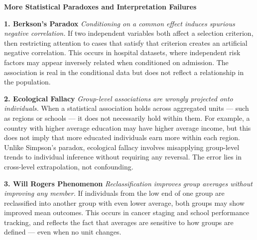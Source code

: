 \begin{center}
{\Large \textbf{More Statistical Paradoxes and Interpretation Failures}}

\end{center}

\vspace{1em}

\begin{tcolorbox}[
  colback=gray!2,
  colframe=gray!60,
  boxrule=0.4pt,
  width=\textwidth,
  arc=1pt,
  left=8pt,
  right=8pt,
  top=6pt,
  bottom=6pt,
  shadow={0mm}{-0.5mm}{0mm}{gray!30}
]

\textbf{1. Berkson’s Paradox}  
\emph{Conditioning on a common effect induces spurious negative correlation.}  
If two independent variables both affect a selection criterion, then restricting attention to cases that satisfy that criterion creates an artificial negative correlation. This occurs in hospital datasets, where independent risk factors may appear inversely related when conditioned on admission. The association is real in the conditional data but does not reflect a relationship in the population.

\vspace{1em}

\textbf{2. Ecological Fallacy}  
\emph{Group-level associations are wrongly projected onto individuals.}  
When a statistical association holds across aggregated units — such as regions or schools — it does not necessarily hold within them. For example, a country with higher average education may have higher average income, but this does not imply that more educated individuals earn more within each region. Unlike Simpson’s paradox, ecological fallacy involves misapplying group-level trends to individual inference without requiring any reversal. The error lies in cross-level extrapolation, not confounding.

\vspace{1em}

\textbf{3. Will Rogers Phenomenon}  
\emph{Reclassification improves group averages without improving any member.}  
If individuals from the low end of one group are reclassified into another group with even lower average, both groups may show improved mean outcomes. This occurs in cancer staging and school performance tracking, and reflects the fact that averages are sensitive to how groups are defined — even when no unit changes.

\vspace{1em}


\end{tcolorbox}
